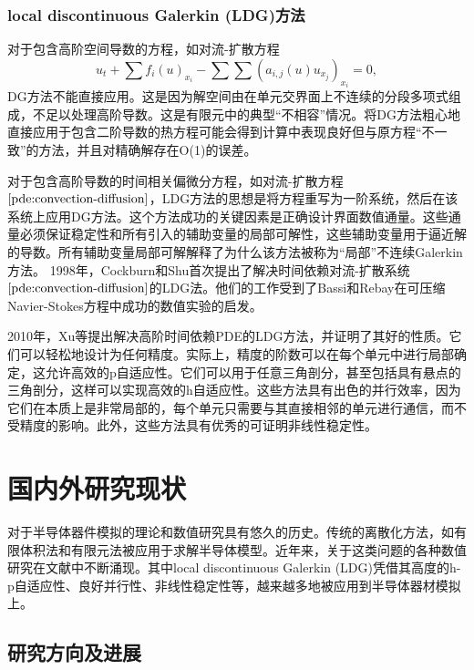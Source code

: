\subsubsection{local discontinuous Galerkin (LDG)方法}
对于包含高阶空间导数的方程，如对流-扩散方程
\begin{equation}\label{pde:convection-diffusion}
    u_t + \sum f_i(u)_{x_i} - \sum \sum (a_{i,j}(u)u_{x_j})_{x_i} = 0,
\end{equation}
DG方法不能直接应用。这是因为解空间由在单元交界面上不连续的分段多项式组成，不足以处理高阶导数。这是有限元中的典型“不相容”情况。将DG方法粗心地直接应用于包含二阶导数的热方程可能会得到计算中表现良好但与原方程“不一致”的方法，并且对精确解存在O(1)的误差\cite{cockburn2001runge,zhang2003analysis}。

对于包含高阶导数的时间相关偏微分方程，如对流-扩散方程$\eqref{pde:convection-diffusion}$，LDG方法的思想是将方程重写为一阶系统，然后在该系统上应用DG方法。这个方法成功的关键因素是正确设计界面数值通量。这些通量必须保证稳定性和所有引入的辅助变量的局部可解性，这些辅助变量用于逼近解的导数。所有辅助变量局部可解解释了为什么该方法被称为“局部”不连续Galerkin方法\cite{cockburn1998local}。
1998年，Cockburn和Shu首次提出了解决时间依赖对流-扩散系统$\eqref{pde:convection-diffusion}$的LDG法\cite{cockburn1998local}。他们的工作受到了Bassi和Rebay在可压缩Navier-Stokes方程中成功的数值实验的启发\cite{bassi1997high}。

2010年，Xu等提出解决高阶时间依赖PDE的LDG方法\cite{xu2010local}，并证明了其好的性质。它们可以轻松地设计为任何精度。实际上，精度的阶数可以在每个单元中进行局部确定，这允许高效的p自适应性。它们可以用于任意三角剖分，甚至包括具有悬点的三角剖分，这样可以实现高效的h自适应性。这些方法具有出色的并行效率，因为它们在本质上是非常局部的，每个单元只需要与其直接相邻的单元进行通信，而不受精度的影响。此外，这些方法具有优秀的可证明非线性稳定性。

\section{国内外研究现状}
对于半导体器件模拟的理论和数值研究具有悠久的历史。传统的离散化方法，如有限体积法\cite{bank1983numerical,bank1998finite,chainais2003finite,bessemoulin2012finite}和有限元法\cite{brezzi1989two,mauri20153d}被应用于求解半导体模型。近年来，关于这类问题的各种数值研究在文献中不断涌现。其中local discontinuous Galerkin (LDG)凭借其高度的h-p自适应性、良好并行性、非线性稳定性等，越来越多地被应用到半导体器材模拟上。
\subsection{研究方向及进展}

